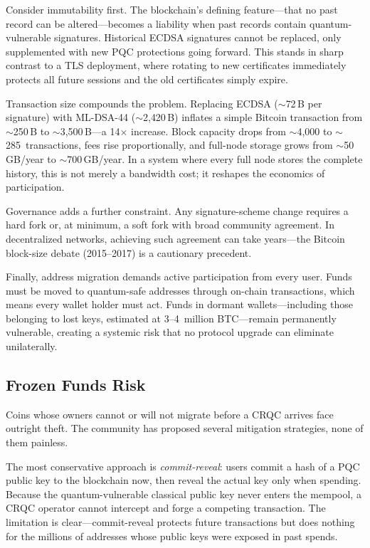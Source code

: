 Consider immutability first.  The blockchain's defining feature---that no past record can be altered---becomes a liability when past records contain quantum-vulnerable signatures.  Historical ECDSA signatures cannot be replaced, only supplemented with new PQC protections going forward.  This stands in sharp contrast to a TLS deployment, where rotating to new certificates immediately protects all future sessions and the old certificates simply expire.

Transaction size compounds the problem.  Replacing ECDSA ($\sim$72\,B per signature) with ML-DSA-44 ($\sim$2{,}420\,B) inflates a simple Bitcoin transaction from $\sim$250\,B to $\sim$3{,}500\,B---a 14$\times$ increase.  Block capacity drops from $\sim$4{,}000 to $\sim$285~transactions, fees rise proportionally, and full-node storage grows from $\sim$50\,GB/year to $\sim$700\,GB/year.  In a system where every full node stores the complete history, this is not merely a bandwidth cost; it reshapes the economics of participation.

Governance adds a further constraint.  Any signature-scheme change requires a hard fork or, at minimum, a soft fork with broad community agreement.  In decentralized networks, achieving such agreement can take years---the Bitcoin block-size debate (2015--2017) is a cautionary precedent.

Finally, address migration demands active participation from every user.  Funds must be moved to quantum-safe addresses through on-chain transactions, which means every wallet holder must act.  Funds in dormant wallets---including those belonging to lost keys, estimated at 3--4~million BTC---remain permanently vulnerable, creating a systemic risk that no protocol upgrade can eliminate unilaterally.

\subsection{Frozen Funds Risk}
\label{subsec:frozen-funds}

Coins whose owners cannot or will not migrate before a CRQC arrives face outright theft.  The community has proposed several mitigation strategies, none of them painless.

The most conservative approach is \emph{commit-reveal}: users commit a hash of a PQC public key to the blockchain now, then reveal the actual key only when spending.  Because the quantum-vulnerable classical public key never enters the mempool, a CRQC operator cannot intercept and forge a competing transaction.  The limitation is clear---commit-reveal protects future transactions but does nothing for the millions of addresses whose public keys were exposed in past spends.

